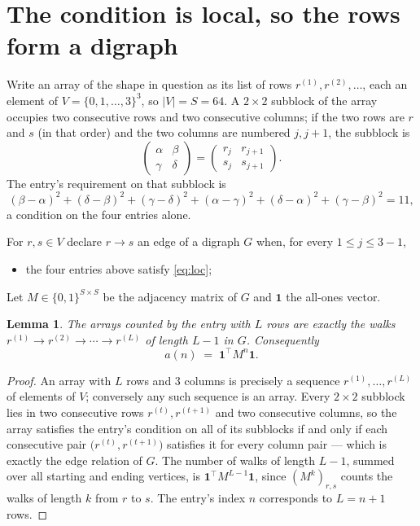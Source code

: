 \documentclass[11pt,a4paper]{article}
\theoremstyle{plain}
\newtheorem{lemma}[theorem]{Lemma}
\theoremstyle{definition}
\begin{document}
\section{The condition is local, so the rows form a digraph}

Write an array of the shape in question as its list of rows
$r^{(1)},r^{(2)},\dots$, each an element of
$V=\{0,1,\dots,3\}^{3}$, so $|V|=S=64$. A $2\times2$ subblock of the array
occupies two consecutive rows and two consecutive columns; if the two rows are $r$
and $s$ (in that order) and the two columns are numbered $j,j+1$,
the subblock is
\[
\begin{pmatrix}\alpha&\beta\\\gamma&\delta\end{pmatrix}=\begin{pmatrix}r_j&r_{j+1}\\s_j&s_{j+1}\end{pmatrix}.
\]
The entry's requirement on that subblock is
\begin{equation}\label{eq:loc}
(\beta-\alpha)^2+(\delta-\beta)^2+(\gamma-\delta)^2+(\alpha-\gamma)^2+(\delta-\alpha)^2+(\gamma-\beta)^2=11,
\end{equation}
a condition on the four entries alone.

For $r,s\in V$ declare $r\to s$ an edge of a digraph $G$ when, for every
$1\le j\le 3-1$,
\begin{itemize}
\item the four entries above satisfy \eqref{eq:loc};

\end{itemize}
Let $M\in\{0,1\}^{S\times S}$ be the adjacency matrix of $G$ and $\mathbf{1}$ the
all-ones vector.

\begin{lemma}\label{lem:walk}
The arrays counted by the entry with $L$ rows are exactly the walks
$r^{(1)}\to r^{(2)}\to\cdots\to r^{(L)}$ of length $L-1$ in $G$. Consequently
\[
a(n)\;=\;\mathbf{1}^{\!\top}M^{n}\mathbf{1} .
\]
\end{lemma}

\begin{proof}
An array with $L$ rows and $3$ columns is precisely a sequence
$r^{(1)},\dots,r^{(L)}$ of elements of $V$; conversely any such sequence is an array.
Every $2\times2$ subblock lies in two consecutive rows $r^{(t)},r^{(t+1)}$ and two
consecutive columns, so the array satisfies the entry's condition on all of its subblocks
if and only if each consecutive pair $\bigl(r^{(t)},r^{(t+1)}\bigr)$ satisfies it for
every column pair --- which is exactly the edge relation of $G$. The number of walks of
length $L-1$, summed over all starting and ending vertices, is
$\mathbf{1}^{\!\top}M^{L-1}\mathbf{1}$, since $(M^{k})_{r,s}$ counts the walks of
length $k$ from $r$ to $s$. The entry's index $n$ corresponds to $L=n+1$ rows.
\end{proof}
\end{document}
